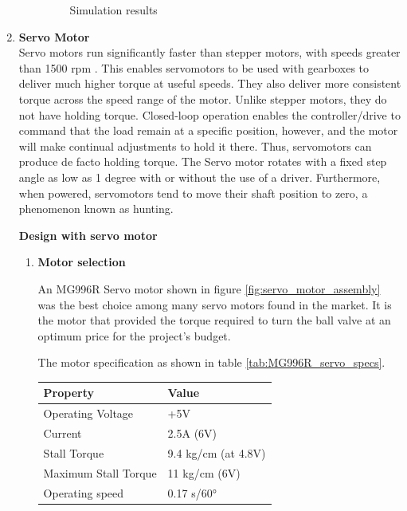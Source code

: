 \begin{enumerate}
\begin{enumerate}
\begin{figure}[H]
        \caption{Simulation results}
        \label{fig:SimulationResults}
    \end{figure}
    
     
    \end{enumerate}
    
    
    \item \textbf{Servo Motor}\\
    Servo motors run significantly faster than stepper motors, with speeds greater than 1500 rpm \cite{halicioglu2016mechanisms}. This enables servomotors to be used with gearboxes to deliver much higher torque at useful speeds. They also deliver more consistent torque across the speed range of the motor. Unlike stepper motors, they do not have holding torque. Closed-loop operation enables the controller/drive to command that the load remain at a specific position, however, and the motor will make continual adjustments to hold it there. Thus, servomotors can produce de facto holding torque\cite{halicioglu2016mechanisms}. The Servo motor rotates with a fixed step angle as low as 1 degree with or without the use of a driver. Furthermore, when powered, servomotors tend to move their shaft position to zero, a phenomenon known as hunting.
    \par
    \textbf{Design with servo motor}
    \begin{enumerate}
    \par
    \item \textbf{Motor selection}
    \par
    An MG996R Servo motor shown in figure \ref{fig:servo_motor_assembly} was the best choice among many servo motors found in the market. It is the motor that provided the torque required to turn the ball valve at an optimum price for the project's budget. 
    \par
    The motor specification as shown in table \ref{tab:MG996R_servo_specs}.
    \begin{table}[H]
    \centering
    \begin{tabular}{|l|l|}
    \hline
    \textbf{Property} & \textbf{Value} \\ \hline
    Operating Voltage & +5V \\ \hline
    Current & 2.5A (6V) \\ \hline
    Stall Torque & 9.4 kg/cm (at 4.8V) \\ \hline
    Maximum Stall Torque & 11 kg/cm (6V) \\ \hline
    Operating speed & 0.17 s/60° \\ \hline

\end{tabular}
\end{table}
\end{enumerate}
\end{enumerate}
